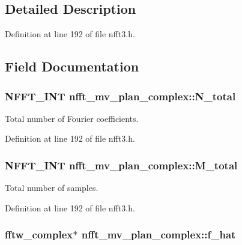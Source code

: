 \subsection{Detailed Description}


Definition at line 192 of file nfft3.\-h.



\subsection{Field Documentation}
\hypertarget{structnfft__mv__plan__complex_ac35a7817c4039590faed8eb76207e148}{
\subsubsection[{N\-\_\-total}]{\setlength{\rightskip}{0pt plus 5cm}N\-F\-F\-T\-\_\-\-I\-N\-T nfft\-\_\-mv\-\_\-plan\-\_\-complex\-::\-N\-\_\-total}}\label{structnfft__mv__plan__complex_ac35a7817c4039590faed8eb76207e148}


Total number of Fourier coefficients. 



Definition at line 192 of file nfft3.\-h.

\hypertarget{structnfft__mv__plan__complex_a2926a8de536d6d0425628404e26cc2e0}{
\subsubsection[{M\-\_\-total}]{\setlength{\rightskip}{0pt plus 5cm}N\-F\-F\-T\-\_\-\-I\-N\-T nfft\-\_\-mv\-\_\-plan\-\_\-complex\-::\-M\-\_\-total}}\label{structnfft__mv__plan__complex_a2926a8de536d6d0425628404e26cc2e0}


Total number of samples. 



Definition at line 192 of file nfft3.\-h.

\hypertarget{structnfft__mv__plan__complex_a391146cff1e8fc3cb981bbbf806ede52}{
\subsubsection[{f\-\_\-hat}]{\setlength{\rightskip}{0pt plus 5cm}fftw\-\_\-complex$\ast$ nfft\-\_\-mv\-\_\-plan\-\_\-complex\-::f\-\_\-hat}}\label{structnfft__mv__plan__complex_a391146cff1e8fc3cb981bbbf806ede52}


